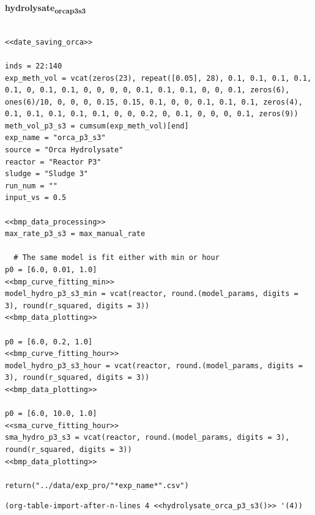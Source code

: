 \documentclass[11pt]{article}
\begin{document}
\textbf{hydrolysate\textsubscript{orca}\textsubscript{p3}\textsubscript{s3}}
\begin{verbatim}

<<date_saving_orca>>

inds = 22:140
exp_meth_vol = vcat(zeros(23), repeat([0.05], 28), 0.1, 0.1, 0.1, 0.1, 0.1, 0, 0.1, 0.1, 0, 0, 0, 0, 0.1, 0.1, 0.1, 0, 0, 0.1, zeros(6), ones(6)/10, 0, 0, 0, 0.15, 0.15, 0.1, 0, 0, 0.1, 0.1, 0.1, zeros(4), 0.1, 0.1, 0.1, 0.1, 0.1, 0, 0, 0.2, 0, 0.1, 0, 0, 0, 0.1, zeros(9)) 
meth_vol_p3_s3 = cumsum(exp_meth_vol)[end]
exp_name = "orca_p3_s3"
source = "Orca Hydrolysate"
reactor = "Reactor P3"
sludge = "Sludge 3"
run_num = ""
input_vs = 0.5

<<bmp_data_processing>>
max_rate_p3_s3 = max_manual_rate

  # The same model is fit either with min or hour
p0 = [6.0, 0.01, 1.0]
<<bmp_curve_fitting_min>>
model_hydro_p3_s3_min = vcat(reactor, round.(model_params, digits = 3), round(r_squared, digits = 3))
<<bmp_data_plotting>>

p0 = [6.0, 0.2, 1.0]
<<bmp_curve_fitting_hour>>
model_hydro_p3_s3_hour = vcat(reactor, round.(model_params, digits = 3), round(r_squared, digits = 3))
<<bmp_data_plotting>>

p0 = [6.0, 10.0, 1.0]
<<sma_curve_fitting_hour>>
sma_hydro_p3_s3 = vcat(reactor, round.(model_params, digits = 3), round(r_squared, digits = 3))
<<bmp_data_plotting>>

return("../data/exp_pro/"*exp_name*".csv")

\end{verbatim}

\begin{verbatim}
(org-table-import-after-n-lines 4 <<hydrolysate_orca_p3_s3()>> '(4))
\end{verbatim}
\end{document}
